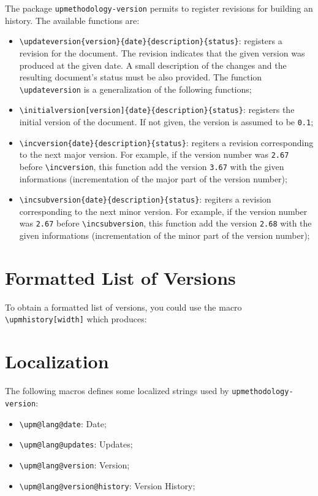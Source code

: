 \documentclass[book]{upmethodology-document}
\begin{document}
The package \texttt{upmethodology-version} permits to register revisions for building an history. The available functions are:
\begin{itemize}
\item \texttt{{\textbackslash}updateversion\{version\}\{date\}\{description\}\{status\}}: registers a revision for the document. The revision indicates that the given version was produced at the given date. A small description of the changes and the resulting document's status must be also provided. The function \texttt{{\textbackslash}updateversion} is a generalization of the following functions;

\item \texttt{{\textbackslash}initialversion[version]\{date\}\{description\}\{status\}}: registers the initial version of the document. If not given, the version is assumed to be \texttt{0.1};

\item \texttt{{\textbackslash}incversion\{date\}\{description\}\{status\}}: regiters a revision corresponding to the next major version. For example, if the version number was \texttt{2.67} before \texttt{{\textbackslash}incversion}, this function add the version \texttt{3.67} with the given informations (incrementation of the major part of the version number);

\item \texttt{{\textbackslash}incsubversion\{date\}\{description\}\{status\}}: regiters a revision corresponding to the next minor version. For example, if the version number was \texttt{2.67} before \texttt{{\textbackslash}incsubversion}, this function add the version \texttt{2.68} with the given informations (incrementation of the minor part of the version number);
\end{itemize}

\section{Formatted List of Versions}

To obtain a formatted list of versions, you could use the macro \texttt{{\textbackslash}upmhistory[width]} which produces:

\upmhistory

\section{Localization}

The following macros defines some localized strings used by \texttt{upmethodology-version}:
\begin{itemize}
\item \texttt{{\textbackslash}upm@lang@date}: Date;
\item \texttt{{\textbackslash}upm@lang@updates}: Updates;
\item \texttt{{\textbackslash}upm@lang@version}: Version;
\item \texttt{{\textbackslash}upm@lang@version@history}: Version History;
\end{itemize}
\end{document}
